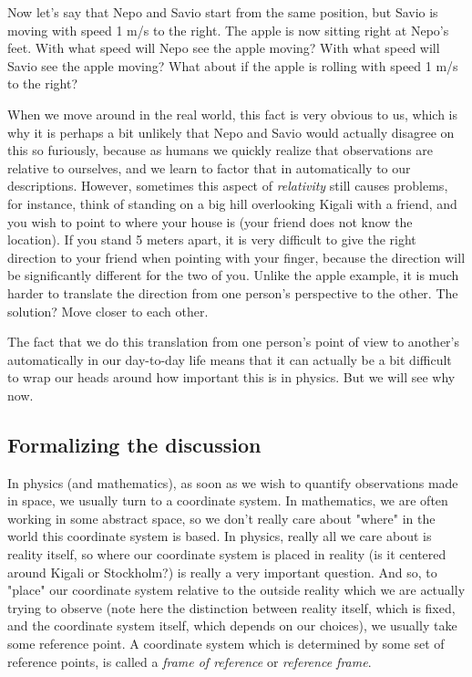 \documentclass{article}
\begin{document}
Now let's say that Nepo and Savio start from the same position, but Savio is moving with speed 1 m/s to the right. The apple is now sitting right at Nepo's feet. With what speed will Nepo see the apple moving? With what speed will Savio see the apple moving? What about if the apple is rolling with speed 1 m/s to the right?

When we move around in the real world, this fact is very obvious to us, which is why it is perhaps a bit unlikely that Nepo and Savio would actually disagree on this so furiously, because as humans we quickly realize that observations are relative to ourselves, and we learn to factor that in automatically to our descriptions. However, sometimes this aspect of \textit{relativity} still causes problems, for instance, think of standing on a big hill overlooking Kigali with a friend, and you wish to point to where your house is (your friend does not know the location). If you stand 5 meters apart, it is very difficult to give the right direction to your friend when pointing with your finger, because the direction will be significantly different for the two of you. Unlike the apple example, it is much harder to translate the direction from one person's perspective to the other. The solution? Move closer to each other.

The fact that we do this translation from one person's point of view to another's automatically in our day-to-day life means that it can actually be a bit difficult to wrap our heads around how important this is in physics. But we will see why now.

\subsection{Formalizing the discussion}
In physics (and mathematics), as soon as we wish to quantify observations made in space, we usually turn to a coordinate system. In mathematics, we are often working in some abstract space, so we don't really care about "where" in the world this coordinate system is based. In physics, really all we care about is reality itself, so where our coordinate system is placed in reality (is it centered around Kigali or Stockholm?) is really a very important question. And so, to "place" our coordinate system relative to the outside reality which we are actually trying to observe (note here the distinction between reality itself, which is fixed, and the coordinate system itself, which depends on our choices), we usually take some reference point. A coordinate system which is determined by some set of reference points, is called a \textit{frame of reference} or \textit{reference frame}. 
\end{document}
